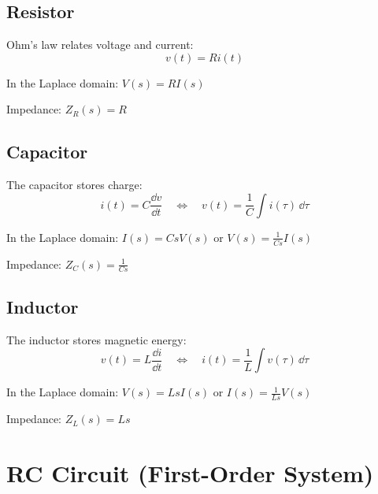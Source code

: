 \subsection{Resistor}

Ohm's law relates voltage and current:
\begin{equation}
v(t) = Ri(t)
\end{equation}

In the Laplace domain: $V(s) = RI(s)$

Impedance: $Z_R(s) = R$



\subsection{Capacitor}

The capacitor stores charge:
\begin{equation}
i(t) = C\frac{\dd v}{\dd t} \quad \Leftrightarrow \quad v(t) = \frac{1}{C}\int i(\tau)\,\dd\tau
\end{equation}

In the Laplace domain: $I(s) = CsV(s)$ or $V(s) = \frac{1}{Cs}I(s)$

Impedance: $Z_C(s) = \frac{1}{Cs}$



\subsection{Inductor}

The inductor stores magnetic energy:
\begin{equation}
v(t) = L\frac{\dd i}{\dd t} \quad \Leftrightarrow \quad i(t) = \frac{1}{L}\int v(\tau)\,\dd\tau
\end{equation}

In the Laplace domain: $V(s) = LsI(s)$ or $I(s) = \frac{1}{Ls}V(s)$

Impedance: $Z_L(s) = Ls$





\section{RC Circuit (First-Order System)}
\label{sec:rc_circuit}

